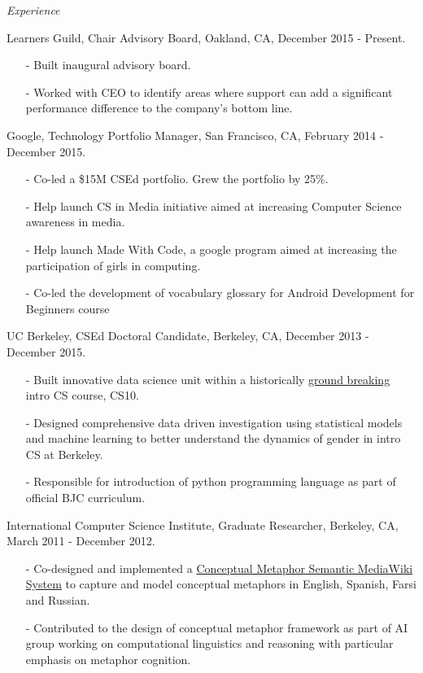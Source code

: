\documentclass[11pt,article,oneside]{memoir}
\begin{document}
\bigskip 

  
\medskip

\noindent\emph{Experience \vspace{0.05in}}


\ind Learners Guild, Chair Advisory Board, Oakland, CA, December 2015 - Present.
\begin{itemize}[noitemsep,nolistsep]
\item[-]Built inaugural advisory board.
\item[-]Worked with CEO to identify areas where support can add a significant performance difference to the company's bottom line.
\end{itemize} 

\ind Google, Technology Portfolio Manager, San Francisco, CA, February 2014 - December 2015. 
\begin{itemize}[noitemsep,nolistsep]
\item[-]Co-led a \$15M CSEd portfolio. Grew the portfolio by 25\%.
\item[-]Help launch CS in Media initiative aimed at increasing Computer Science awareness in media.
\item[-]Help launch Made With Code, a google program aimed at increasing the participation of girls in computing.
\item[-]Co-led the development of vocabulary glossary for Android Development for Beginners course
\end{itemize} 

\ind UC Berkeley, CSEd Doctoral Candidate, Berkeley, CA, December 2013 - December 2015.
\begin{itemize}[noitemsep,nolistsep]
\item[-] Built innovative data science unit within a historically \href{http://www.whitehouse.gov/the-press-office/2014/12/08/fact-sheet-new-commitments-support-computer-science-education}{ground breaking} intro CS course, CS10.
\item[-] Designed comprehensive data driven investigation using statistical models and machine learning to better understand the dynamics of gender in intro CS at Berkeley.
\item[-]Responsible for introduction of python programming language as part of official BJC curriculum.
\end{itemize} 

\ind International Computer Science Institute, Graduate Researcher, Berkeley, CA, March 2011 - December 2012.
\begin{itemize}[noitemsep,nolistsep]
\item[-] Co-designed and implemented a \href{http://metaphor.icsi.berkeley.edu}{Conceptual Metaphor Semantic MediaWiki System} to capture and model conceptual metaphors in English, Spanish, Farsi and Russian. 
\item[-] Contributed to the design of conceptual metaphor framework as part of AI group working on computational linguistics and reasoning with particular emphasis on metaphor cognition.
\end{itemize} 
\end{document}
